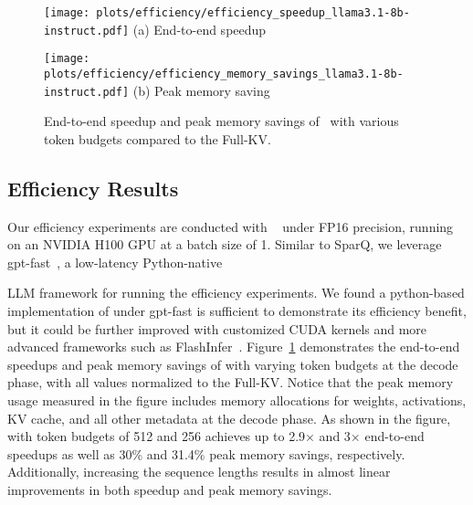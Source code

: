 \begin{figure}[t]
    \centering
    \begin{minipage}[t]{0.45\textwidth}
        \centering
        \texttt{[image: plots/efficiency/efficiency\_speedup\_llama3.1-8b-instruct.pdf]}
        {\small (a) End-to-end speedup}
        \label{fig:eff_speed_llama318b}
    \end{minipage}
    \hspace{15mm}
    \begin{minipage}[t]{0.45\textwidth}
        \centering
        \texttt{[image: plots/efficiency/efficiency\_memory\_savings\_llama3.1-8b-instruct.pdf]}
        {\small (b) Peak memory saving}
        \label{fig:eff_mem_llama318b}
    \end{minipage}
    \hfill
    \caption{End-to-end speedup and peak memory savings of \rocketkv\ with various token budgets compared to the Full-KV.}
    \label{fig:eff_speedup}
\end{figure}



\subsection{Efficiency Results }
Our efficiency experiments are conducted with \llama~\cite{metaai2024} under FP16 precision, running on an NVIDIA H100 GPU at a batch size of 1. Similar to SparQ, we leverage gpt-fast~\cite{gptfast2023}, a low-latency Python-native

LLM framework for running the efficiency experiments. 
We found a python-based implementation of \rocketkv under gpt-fast is sufficient to demonstrate its efficiency benefit, but it could be further improved with customized CUDA kernels and more advanced frameworks such as FlashInfer~\cite{flashinfer2025}.
Figure~\ref{fig:eff_speedup} demonstrates the end-to-end speedups and peak memory savings of \rocketkv with varying token budgets at the decode phase, with all values normalized to the Full-KV. 
Notice that the peak memory usage measured in the figure includes memory allocations for weights, activations, KV cache, and all other metadata at the decode phase.
As shown in the figure, \rocketkv with token budgets of 512 and 256 achieves up to 2.9$\times$ and 3$\times$ end-to-end speedups as well as 30\% and 31.4\% peak memory savings, respectively. Additionally, increasing the sequence lengths results in almost linear improvements in both speedup and peak memory savings.














